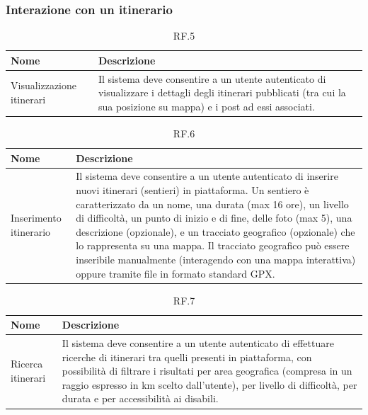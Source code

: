 \documentclass{natourDoc}
\begin{document}
\subsubsection{Interazione con un itinerario}
\begin{table}[H]
	\centering
	\begin{tabular}{ |p{5cm}|p{10.3cm}| }
		\hline
		\rowcolor{PineGreen!70}
		\textbf{Nome}             & \textbf{Descrizione}                                                 \\
		\hline
		Visualizzazione itinerari & Il sistema deve consentire a un utente autenticato di visualizzare i
		dettagli degli itinerari pubblicati (tra cui la sua posizione su mappa) e i post ad essi associati.                                  \\
		\hline
	\end{tabular}
	\caption{RF.5}

\end{table}

\begin{table}[H]
	\centering
	\begin{tabular}{ |p{5cm}|p{10.3cm}| }
		\hline
		\rowcolor{PineGreen!70}
		\textbf{Nome}          & \textbf{Descrizione}                                                                                                    \\
		\hline
		Inserimento itinerario & Il sistema deve consentire a un utente autenticato di inserire nuovi itinerari (sentieri) in piattaforma. Un sentiero è
		caratterizzato da un nome, una durata (max 16 ore), un livello di difficoltà, un punto di inizio e di fine, delle foto (max 5), una descrizione
		(opzionale), e un tracciato geografico (opzionale) che lo rappresenta su una mappa. Il tracciato
		geografico può essere inseribile manualmente (interagendo con una mappa interattiva) oppure
		tramite file in formato standard GPX.                                                                                                            \\
		\hline
	\end{tabular}
	\caption{RF.6}

\end{table}

\begin{table}[H]
	\centering
	\begin{tabular}{ |p{5cm}|p{10.3cm}| }
		\hline
		\rowcolor{PineGreen!70}
		\textbf{Nome}     & \textbf{Descrizione}                                                                                                                                               \\
		\hline
		Ricerca itinerari & Il sistema deve consentire a un utente autenticato di effettuare ricerche di itinerari tra quelli presenti in piattaforma, con possibilità di filtrare i risultati
		per area geografica (compresa in un raggio espresso in km scelto dall'utente), per livello di difficoltà, per durata e per accessibilità ai disabili.                                  \\
		\hline
	\end{tabular}
	\caption{RF.7}

\end{table}
\end{document}
